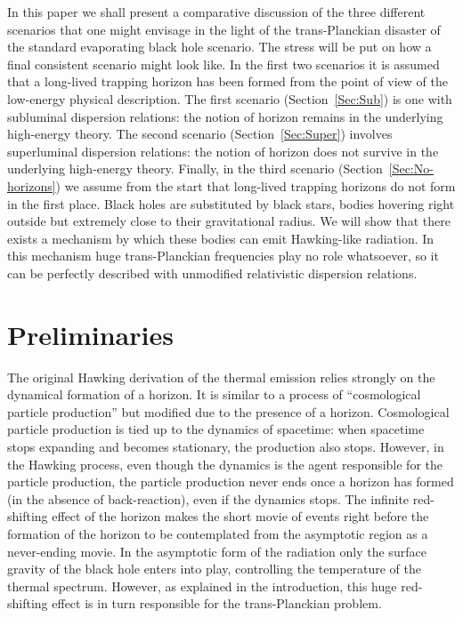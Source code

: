 \documentclass[12pt]{article}
\begin{document}
In this paper we shall present a comparative discussion of the three different
scenarios that one might envisage in the light of the trans-Planckian disaster
of the standard evaporating black hole scenario. The stress will be put on how a
final consistent scenario might look like. In the first two scenarios it is assumed that a long-lived trapping horizon has been formed from the point of view of 
the low-energy physical description. The first scenario
(Section~\ref{Sec:Sub}) is one with subluminal dispersion relations: the
notion of horizon remains in the underlying high-energy theory.
The second scenario (Section~\ref{Sec:Super}) involves superluminal
dispersion relations: the notion of horizon does not survive in the underlying high-energy theory. Finally, in the third scenario (Section~\ref{Sec:No-horizons}) we 
assume from the start that long-lived trapping horizons do not form in the first 
place. Black holes are substituted by black stars, bodies hovering right outside but extremely close to their gravitational radius. We will show that there exists a mechanism by which these bodies can emit Hawking-like radiation. In this mechanism huge trans-Planckian frequencies play no role whatsoever, so it can be perfectly described  
with unmodified relativistic dispersion relations. 



\section{Preliminaries}
\label{Sec:Preliminaries}


The original Hawking derivation of the thermal emission relies strongly on the
dynamical formation of a horizon. It is similar to a process of ``cosmological
particle production'' but modified due to the presence of a horizon.
Cosmological particle production  is tied up to the dynamics of 
spacetime: when  spacetime stops expanding and becomes stationary, the
production also stops. However, in the Hawking process, even though the dynamics is
the agent responsible for the particle production, the particle production never ends once a horizon has formed (in the absence of
back-reaction), even if the dynamics stops. The infinite red-shifting effect of the horizon makes the short movie of events right before the formation of the horizon to be contemplated  from the asymptotic region as a never-ending movie. In the asymptotic form of
the radiation only the surface gravity of the black hole enters into play,
controlling the temperature of the thermal spectrum. However, as explained in
the introduction, this huge red-shifting effect is in turn responsible for the
trans-Planckian problem.
\end{document}
